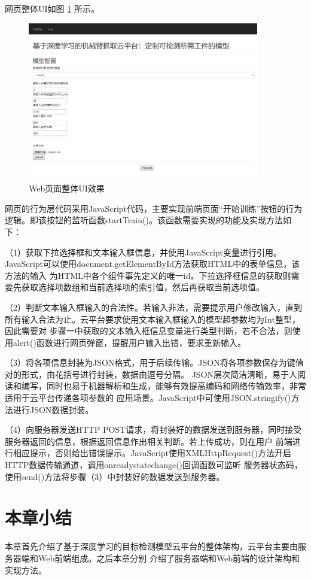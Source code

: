 网页整体UI如图 \ref{fig:total_ui} 所示。

\begin{figure}[h]
    \centering
    \includegraphics[width=0.9\textwidth]{pic/chap4/total_ui.png}
    \caption{Web页面整体UI效果}
    \label{fig:total_ui}
\end{figure}

网页的行为层代码采用JavaScript代码，主要实现前端页面“开始训练”按钮的行为逻辑。即该按钮的监听函数startTrain()。该函数需要实现的功能及实现方法如下：

（1）获取下拉选择框和文本输入框信息，并使用JavaScript变量进行引用。JavaScript可以使用document.getElementById方法获取HTML中的表单信息，该方法的输入
为HTML中各个组件事先定义的唯一id。下拉选择框信息的获取则需要先获取选择项数组和当前选择项的索引值，然后再获取当前选项值。

（2）判断文本输入框输入的合法性。若输入非法，需要提示用户修改输入，直到所有输入合法为止。云平台要求使用文本输入框输入的模型超参数均为Int整型，因此需要对
步骤一中获取的文本输入框信息变量进行类型判断，若不合法，则使用alert()函数进行网页弹窗，提醒用户输入出错，要求重新输入。

（3）将各项信息封装为JSON\cite{JSON}格式，用于后续传输。JSON将各项参数保存为键值对的形式，由花括号进行封装，数据由逗号分隔。
JSON层次简洁清晰，易于人阅读和编写，同时也易于机器解析和生成，能够有效提高编码和网络传输效率，非常适用于云平台传递各项参数的
应用场景。JavaScript中可使用JSON.stringify()方法进行JSON数据封装。

（4）向服务器发送HTTP POST请求，将封装好的数据发送到服务器，同时接受服务器返回的信息，根据返回信息作出相关判断。若上传成功，则在用户
前端进行相应提示，否则给出错误提示。JavaScript使用XMLHttpRequest()方法开启HTTP数据传输通道，调用onreadystatechange()回调函数可监听
服务器状态码，使用send()方法将步骤（3）中封装好的数据发送到服务器。

\section{本章小结}

本章首先介绍了基于深度学习的目标检测模型云平台的整体架构，云平台主要由服务器端和Web前端组成。之后本章分别
介绍了服务器端和Web前端的设计架构和实现方法。


